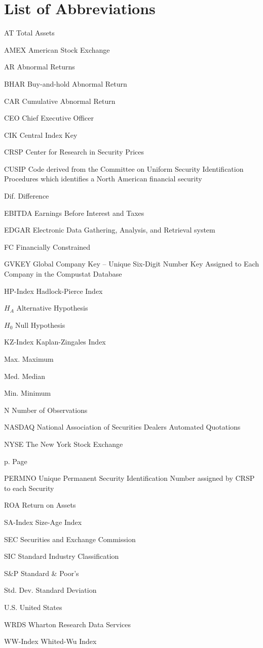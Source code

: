 \documentclass[12pt]{article}
\newcommand{\abbrlabel}[1]{\makebox[7cm][l]{#1\ \dotfill}}
\newenvironment{abbreviations}{\begin{list}{}{\renewcommand{\makelabel}{\abbrlabel}\setlength{\labelwidth}{7cm}\setlength{\leftmargin}{\labelwidth+\labelsep}%
\setlength{\itemsep}{0pt}}}{\end{list}}
\begin{document}
\section*{List of Abbreviations}
\begin{abbreviations}
	\item[AT] Total Assets
	\item[AMEX] American Stock Exchange
	\item[AR] Abnormal Returns
	\item[BHAR] Buy-and-hold Abnormal Return
	\item[CAR] Cumulative Abnormal Return
	\item[CEO] Chief Executive Officer
	\item[CIK] Central Index Key
	\item[CRSP] Center for Research in Security Prices
	\item[CUSIP] Code derived from the Committee on Uniform Security Identification Procedures which identifies a North American financial security
	\item[Dif.] Difference
	\item[EBITDA] Earnings Before Interest and Taxes
	\item[EDGAR] Electronic Data Gathering, Analysis, and Retrieval system
	\item[FC] Financially Constrained
	\item[GVKEY] Global Company Key -- Unique Six-Digit Number Key Assigned to Each Company in the Compustat Database
	\item[HP-Index] Hadlock-Pierce Index
	\item[$H_{A}$] Alternative Hypothesis 
	\item[$H_{0}$] Null Hypothesis 
	\item[KZ-Index] Kaplan-Zingales Index
	\item[Max.] Maximum
	\item[Med.] Median
	\item[Min.] Minimum
	\item[N] Number of Observations
	\item[NASDAQ] National Association of Securities Dealers Automated Quotations
	\item[NYSE] The New York Stock Exchange
	\item[p.] Page
	\item[PERMNO] Unique Permanent Security Identification Number assigned by CRSP to each Security
	\item[ROA] Return on Assets
	\item[SA-Index] Size-Age Index
	\item[SEC] Securities and Exchange Commission
	\item[SIC] Standard Industry Classification
	\item[S\&P] Standard \& Poor's
	\item[Std. Dev.] Standard Deviation
	\item[U.S.] United States
	\item[WRDS] Wharton Research Data Services
	\item[WW-Index] Whited-Wu Index
\end{abbreviations}
\end{document}
